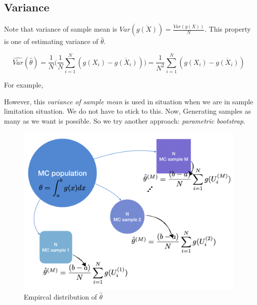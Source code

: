 \documentclass[]{book}
\newenvironment{Shaded}{\begin{snugshade}}{\end{snugshade}}
\newcommand{\CommentTok}[1]{\textcolor[rgb]{0.56,0.35,0.01}{\textit{#1}}}
\newcommand{\DataTypeTok}[1]{\textcolor[rgb]{0.13,0.29,0.53}{#1}}
\newcommand{\DecValTok}[1]{\textcolor[rgb]{0.00,0.00,0.81}{#1}}
\newcommand{\KeywordTok}[1]{\textcolor[rgb]{0.13,0.29,0.53}{\textbf{#1}}}
\newcommand{\NormalTok}[1]{#1}
\newcommand{\OperatorTok}[1]{\textcolor[rgb]{0.81,0.36,0.00}{\textbf{#1}}}
\newcommand{\StringTok}[1]{\textcolor[rgb]{0.31,0.60,0.02}{#1}}
\theoremstyle{definition}
\theoremstyle{definition}
\theoremstyle{definition}
\theoremstyle{remark}
\begin{document}
\hypertarget{variance}{%
\subsection{Variance}\label{variance}}

Note that variance of sample mean is \(Var(\overline{g(X)}) = \frac{Var(g(X))}{N}\). This property is one of estimating variance of \(\hat\theta\).

\begin{equation}
  \widehat{Var}(\hat\theta) = \frac{1}{N}\bigg( \frac{1}{N} \sum_{i = 1}^N (g(X_i) - \overline{g(X_i)}) \bigg) = \frac{1}{N^2} \sum_{i = 1}^N (g(X_i) - \overline{g(X_i)})
  \label{eq:mcsamvar}
\end{equation}

For example,

\begin{Shaded}
\end{Shaded}

However, this \emph{variance of sample mean} is used in situation when we are in sample limitation situation. We do not have to stick to this. Now, Generating samples as many as we want is possible. So we try another approach: \emph{parametric bootstrap}.

\begin{figure}[H]

{\centering \includegraphics[width=0.7\linewidth]{images/mcint} 

}

\caption{Empircal distribution of $\hat\theta$}\label{fig:mcintvar}
\end{figure}
\end{document}
